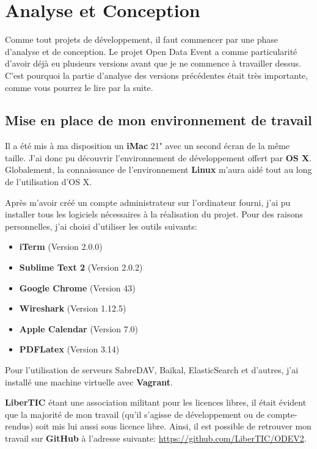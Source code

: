 \section{Analyse et Conception}

Comme tout projets de développement, il faut commencer par une phase d'analyse et de conception. Le projet Open Data Event a comme particularité d'avoir déjà eu plusieurs versions avant que je ne commence à travailler dessus. C'est pourquoi la partie d'analyse des versions précédentes était très importante, comme vous pourrez le lire par la suite.

\subsection{Mise en place de mon environnement de travail}

Il a été mis à ma disposition un \textbf{iMac} 21" avec un second écran de la même taille. J'ai donc pu découvrir l'environnement de développement offert par \textbf{OS X}. Globalement, la connaissance de l'environnement \textbf{Linux} m'aura aidé tout au long de l'utilisation d'OS X.

Après m'avoir créé un compte administrateur sur l'ordinateur fourni, j'ai pu installer tous les logiciels nécessaires à la réalisation du projet. Pour des raisons personnelles, j'ai choisi d'utiliser les outils suivants:

\begin{itemize}
    \item \textbf{iTerm} (Version 2.0.0)
    \item \textbf{Sublime Text 2} (Version 2.0.2)
    \item \textbf{Google Chrome} (Version 43)
    \item \textbf{Wireshark} (Version 1.12.5)
    \item \textbf{Apple Calendar} (Version 7.0)
    \item \textbf{PDFLatex} (Version 3.14)
\end{itemize}

Pour l'utilisation de serveurs SabreDAV, Baïkal, ElasticSearch et d'autres, j'ai installé une machine virtuelle avec \textbf{Vagrant}.

\textbf{LiberTIC} étant une association militant pour les licences libres, il était évident que la majorité de mon travail (qu'il s'agisse de développement ou de compte-rendus) soit mis lui aussi sous licence libre. Ainsi, il est possible de retrouver mon travail sur \textbf{GitHub} à l'adresse suivante: \url{https://github.com/LiberTIC/ODEV2}.


